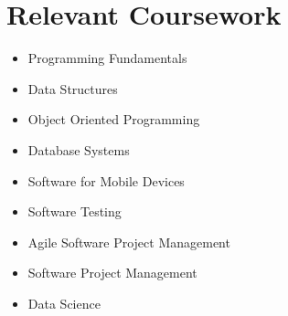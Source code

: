 \documentclass[letterpaper,11pt]{article}
\makeatletter
\newcommand{\resumeItem}[1]{
  \item\small{
    {#1 \vspace{-2pt}}
  }
}
\newcommand{\resumeSubheading}[4]{
  \vspace{-2pt}\item
    \begin{tabular*}{1.0\textwidth}[t]{l@{\extracolsep{\fill}}r}
      \textbf{#1} & \textbf{\small #2} \\
      \textit{\small#3} & \textit{\small #4} \\
    \end{tabular*}\vspace{-7pt}
}
\newcommand{\resumeSubHeadingListStart}{\begin{itemize}[leftmargin=0.0in, label={}]}
\newcommand{\resumeSubHeadingListEnd}{\end{itemize}}
\newcommand{\resumeItemListStart}{\begin{itemize}}
\newcommand{\resumeItemListEnd}{\end{itemize}\vspace{-5pt}}
\makeatother
\begin{document}

\section{Relevant Coursework}
        \begin{multicols}{3}
            \begin{itemize}[itemsep=-5pt, parsep=3pt]
                \item \small Programming Fundamentals
                \item \small Data Structures
                \item \small Object Oriented Programming
                \item \small Database Systems	
                \item \small Software for Mobile Devices
                \item \small Software Testing
                \item \small Agile Software Project Management
                \item \small Software Project Management
                \item \small Data Science
            \end{itemize}
        \end{multicols}
        \vspace*{2.0\multicolsep}











\end{document}
